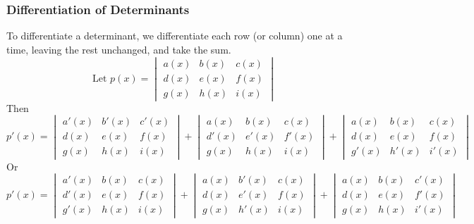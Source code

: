 \documentclass[14]{article}
\theoremstyle{definition}
\theoremstyle{case}
\begin{document}
\subsubsection{Differentiation of Determinants}
To differentiate a determinant, we differentiate each row (or column) one at a time, leaving the rest unchanged, and take the sum.
\[\text{Let } p(x)= 
\begin{vmatrix}a(x)&b(x)&c(x)\\d(x)&e(x)&f(x)\\g(x)&h(x)&i(x)\end{vmatrix}
\]
Then
\[p'(x) = 
\begin{vmatrix}a'(x)&b'(x)&c'(x)\\d(x)&e(x)&f(x)\\g(x)&h(x)&i(x)\end{vmatrix} +
\begin{vmatrix}a(x)&b(x)&c(x)\\d'(x)&e'(x)&f'(x)\\g(x)&h(x)&i(x)\end{vmatrix} +
\begin{vmatrix}a(x)&b(x)&c(x)\\d(x)&e(x)&f(x)\\g'(x)&h'(x)&i'(x)\end{vmatrix}
\]
Or
\[p'(x) = 
\begin{vmatrix}a'(x)&b(x)&c(x)\\d'(x)&e(x)&f(x)\\g'(x)&h(x)&i(x)\end{vmatrix} +
\begin{vmatrix}a(x)&b'(x)&c(x)\\d(x)&e'(x)&f(x)\\g(x)&h'(x)&i(x)\end{vmatrix} +
\begin{vmatrix}a(x)&b(x)&c'(x)\\d(x)&e(x)&f'(x)\\g(x)&h(x)&i'(x)\end{vmatrix}
\]
\end{document}
